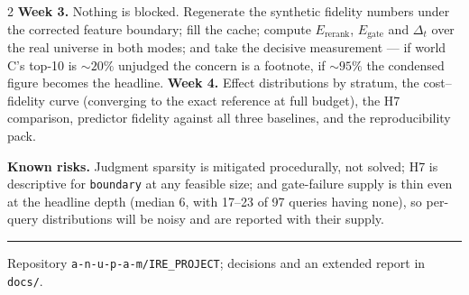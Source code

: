 \documentclass[10pt,a4paper]{article}
\begin{document}
\begin{multicols}{2}
\textbf{Week 3.} Nothing is blocked. Regenerate the synthetic fidelity numbers
under the corrected feature boundary; fill the cache; compute $E_{\text{rerank}}$, $E_{\text{gate}}$ and
$\Delta_t$ over the real universe in both modes; and take the decisive
measurement --- if world C's top-10 is ${\sim}20\%$ unjudged the concern is a
footnote, if ${\sim}95\%$ the condensed figure becomes the headline.
\textbf{Week 4.} Effect distributions by stratum, the cost--fidelity curve
(converging to the exact reference at full budget), the H7 comparison,
predictor fidelity against all three baselines, and the reproducibility pack.

\textbf{Known risks.} Judgment sparsity is mitigated procedurally, not solved;
H7 is descriptive for \texttt{boundary} at any feasible size; and gate-failure
supply is thin even at the headline depth (median 6, with 17--23 of 97 queries
having none), so per-query distributions will be noisy and are reported with
their supply.

\end{multicols}
\vspace{1pt}\hrule\vspace{1pt}
{\footnotesize Repository \texttt{a-n-u-p-a-m/IRE\_PROJECT}; decisions and an
extended report in \texttt{docs/}.}
\end{document}
